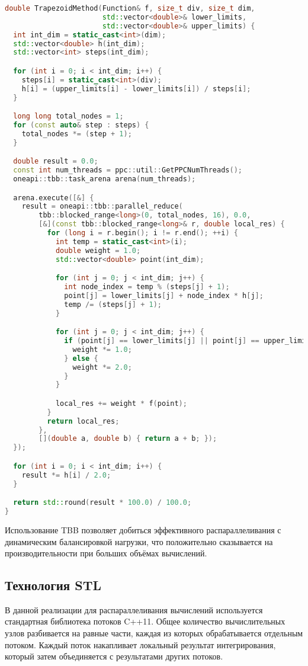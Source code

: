 \documentclass[a4paper,14pt]{article}
\begin{document}
\begin{lstlisting}[language=C++]
double TrapezoidMethod(Function& f, size_t div, size_t dim,
                       std::vector<double>& lower_limits,
                       std::vector<double>& upper_limits) {
  int int_dim = static_cast<int>(dim);
  std::vector<double> h(int_dim);
  std::vector<int> steps(int_dim);

  for (int i = 0; i < int_dim; i++) {
    steps[i] = static_cast<int>(div);
    h[i] = (upper_limits[i] - lower_limits[i]) / steps[i];
  }

  long long total_nodes = 1;
  for (const auto& step : steps) {
    total_nodes *= (step + 1);
  }

  double result = 0.0;
  const int num_threads = ppc::util::GetPPCNumThreads();
  oneapi::tbb::task_arena arena(num_threads);

  arena.execute([&] {
    result = oneapi::tbb::parallel_reduce(
        tbb::blocked_range<long>(0, total_nodes, 16), 0.0,
        [&](const tbb::blocked_range<long>& r, double local_res) {
          for (long i = r.begin(); i != r.end(); ++i) {
            int temp = static_cast<int>(i);
            double weight = 1.0;
            std::vector<double> point(int_dim);

            for (int j = 0; j < int_dim; j++) {
              int node_index = temp % (steps[j] + 1);
              point[j] = lower_limits[j] + node_index * h[j];
              temp /= (steps[j] + 1);
            }

            for (int j = 0; j < int_dim; j++) {
              if (point[j] == lower_limits[j] || point[j] == upper_limits[j]) {
                weight *= 1.0;
              } else {
                weight *= 2.0;
              }
            }

            local_res += weight * f(point);
          }
          return local_res;
        },
        [](double a, double b) { return a + b; });
  });

  for (int i = 0; i < int_dim; i++) {
    result *= h[i] / 2.0;
  }

  return std::round(result * 100.0) / 100.0;
}
\end{lstlisting}

Использование TBB позволяет добиться эффективного распараллеливания с динамическим балансировкой нагрузки, что положительно сказывается на производительности при больших объёмах вычислений.

\subsection{Технология STL}
В данной реализации для распараллеливания вычислений используется стандартная библиотека потоков C++11. Общее количество вычислительных узлов разбивается на равные части, каждая из которых обрабатывается отдельным потоком. Каждый поток накапливает локальный результат интегрирования, который затем объединяется с результатами других потоков.
\end{document}
